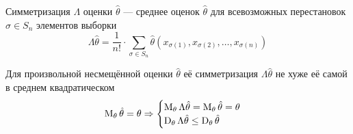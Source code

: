 \begin{definition}[Симметризация]
  Симметризация $\Lambda$ оценки $\hat{\theta}$ --- среднее
  оценок $\hat{\theta}$ для
  всевозможных перестановок $\sigma\in S_n$
  элементов выборки \xsample
  $$\Lambda\hat{\theta}
      = \frac{1}{n!}\cdot \sum_{\sigma\in S_n} \hat{\theta}\left(
      x_{\sigma\left(1\right)}, x_{\sigma\left(2\right)},
          \dots, x_{\sigma\left(n\right)}\right)$$
\end{definition}
\begin{lemma}
  Для произвольной несмещённой оценки $\hat{\theta}$
  её симметризация $\Lambda{\hat{\theta}}$
  не хуже её самой в среднем квадратическом
  \begin{align*}
  \operatorname{M}_{\theta} \hat{\theta}
      = \theta
  \Rightarrow
      \begin{cases}
      \operatorname{M}_{\theta} \Lambda{\hat{\theta}}
          = \operatorname{M}_{\theta} \hat{\theta}
          = \theta\\
      \operatorname{D}_{\theta} \Lambda{\hat{\theta}}
          \le\operatorname{D}_{\theta} \hat{\theta}
      \end{cases}
  \end{align*}
\end{lemma}
